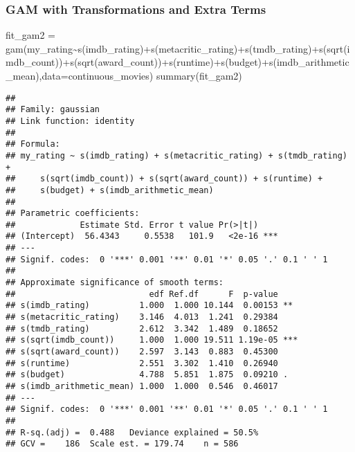 \documentclass[
]{article}
\newenvironment{Shaded}{\begin{snugshade}}{\end{snugshade}}
\newcommand{\AttributeTok}[1]{\textcolor[rgb]{0.77,0.63,0.00}{#1}}
\newcommand{\FunctionTok}[1]{\textcolor[rgb]{0.00,0.00,0.00}{#1}}
\newcommand{\NormalTok}[1]{#1}
\newcommand{\OtherTok}[1]{\textcolor[rgb]{0.56,0.35,0.01}{#1}}
\newcommand{\SpecialCharTok}[1]{\textcolor[rgb]{0.00,0.00,0.00}{#1}}
\begin{document}
\hypertarget{gam-with-transformations-and-extra-terms}{%
\subsubsection{GAM with Transformations and Extra
Terms}\label{gam-with-transformations-and-extra-terms}}

\begin{Shaded}
\begin{Highlighting}[]
\NormalTok{fit\_gam2 }\OtherTok{=} \FunctionTok{gam}\NormalTok{(my\_rating}\SpecialCharTok{\textasciitilde{}}\FunctionTok{s}\NormalTok{(imdb\_rating)}\SpecialCharTok{+}\FunctionTok{s}\NormalTok{(metacritic\_rating)}\SpecialCharTok{+}\FunctionTok{s}\NormalTok{(tmdb\_rating)}\SpecialCharTok{+}\FunctionTok{s}\NormalTok{(}\FunctionTok{sqrt}\NormalTok{(imdb\_count))}\SpecialCharTok{+}\FunctionTok{s}\NormalTok{(}\FunctionTok{sqrt}\NormalTok{(award\_count))}\SpecialCharTok{+}\FunctionTok{s}\NormalTok{(runtime)}\SpecialCharTok{+}\FunctionTok{s}\NormalTok{(budget)}\SpecialCharTok{+}\FunctionTok{s}\NormalTok{(imdb\_arithmetic\_mean),}\AttributeTok{data=}\NormalTok{continuous\_movies)}
\FunctionTok{summary}\NormalTok{(fit\_gam2)}
\end{Highlighting}
\end{Shaded}

\begin{verbatim}
## 
## Family: gaussian 
## Link function: identity 
## 
## Formula:
## my_rating ~ s(imdb_rating) + s(metacritic_rating) + s(tmdb_rating) + 
##     s(sqrt(imdb_count)) + s(sqrt(award_count)) + s(runtime) + 
##     s(budget) + s(imdb_arithmetic_mean)
## 
## Parametric coefficients:
##             Estimate Std. Error t value Pr(>|t|)    
## (Intercept)  56.4343     0.5538   101.9   <2e-16 ***
## ---
## Signif. codes:  0 '***' 0.001 '**' 0.01 '*' 0.05 '.' 0.1 ' ' 1
## 
## Approximate significance of smooth terms:
##                           edf Ref.df      F  p-value    
## s(imdb_rating)          1.000  1.000 10.144  0.00153 ** 
## s(metacritic_rating)    3.146  4.013  1.241  0.29384    
## s(tmdb_rating)          2.612  3.342  1.489  0.18652    
## s(sqrt(imdb_count))     1.000  1.000 19.511 1.19e-05 ***
## s(sqrt(award_count))    2.597  3.143  0.883  0.45300    
## s(runtime)              2.551  3.302  1.410  0.26940    
## s(budget)               4.788  5.851  1.875  0.09210 .  
## s(imdb_arithmetic_mean) 1.000  1.000  0.546  0.46017    
## ---
## Signif. codes:  0 '***' 0.001 '**' 0.01 '*' 0.05 '.' 0.1 ' ' 1
## 
## R-sq.(adj) =  0.488   Deviance explained = 50.5%
## GCV =    186  Scale est. = 179.74    n = 586
\end{verbatim}
\end{document}
